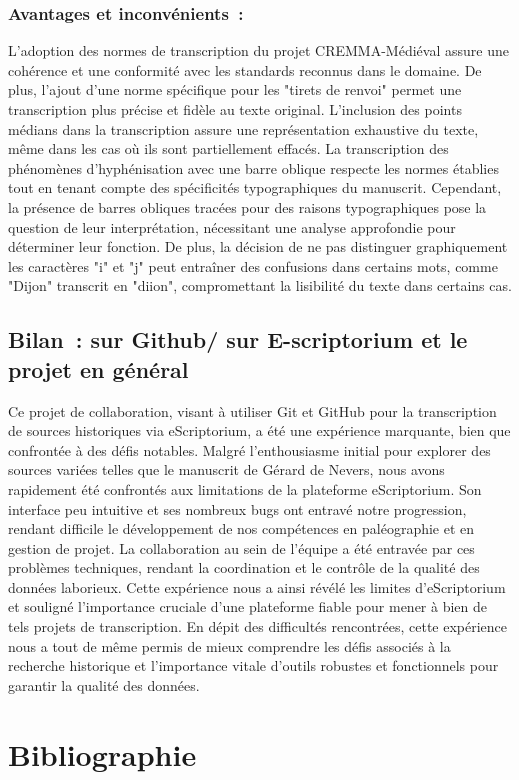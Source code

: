 \documentclass[12pt,a4paper,oneside,titlepage]{article} %
\begin{document}
	
	\subsubsection{Avantages et inconvénients :}
	
	L'adoption des normes de transcription du projet CREMMA-Médiéval assure une cohérence et une conformité avec les standards reconnus dans le domaine. De plus, l'ajout d'une norme spécifique pour les "tirets de renvoi" permet une transcription plus précise et fidèle au texte original. L'inclusion des points médians dans la transcription assure une représentation exhaustive du texte, même dans les cas où ils sont partiellement effacés. La transcription des phénomènes d'hyphénisation avec une barre oblique respecte les normes établies tout en tenant compte des spécificités typographiques du manuscrit. Cependant, la présence de barres obliques tracées pour des raisons typographiques pose la question de leur interprétation, nécessitant une analyse approfondie pour déterminer leur fonction. De plus, la décision de ne pas distinguer graphiquement les caractères "i" et "j" peut entraîner des confusions dans certains mots, comme "Dijon" transcrit en "diion", compromettant la lisibilité du texte dans certains cas.
	
	\subsection{Bilan : sur Github/ sur E-scriptorium et le projet en général}
	
	Ce projet de collaboration, visant à utiliser Git et GitHub pour la transcription de sources historiques via eScriptorium, a été une expérience marquante, bien que confrontée à des défis notables. 
	Malgré l'enthousiasme initial pour explorer des sources variées telles que le manuscrit de Gérard de Nevers, nous avons rapidement été confrontés aux limitations de la plateforme eScriptorium. 
	Son interface peu intuitive et ses nombreux bugs ont entravé notre progression, rendant difficile le développement de nos compétences en paléographie et en gestion de projet. 
	La collaboration au sein de l'équipe a été entravée par ces problèmes techniques, rendant la coordination et le contrôle de la qualité des données laborieux. Cette expérience nous a ainsi révélé les limites d'eScriptorium et souligné l'importance cruciale d'une plateforme fiable pour mener à bien de tels projets de transcription. 
	En dépit des difficultés rencontrées, cette expérience nous a tout de même permis de mieux comprendre les défis associés à la recherche historique et l'importance vitale d'outils robustes et fonctionnels pour garantir la qualité des données.
	
	
\section{Bibliographie}
	
	
	
	\newpage
	
	\nocite{*}
	\printbibliography
	
	
\end{document}
